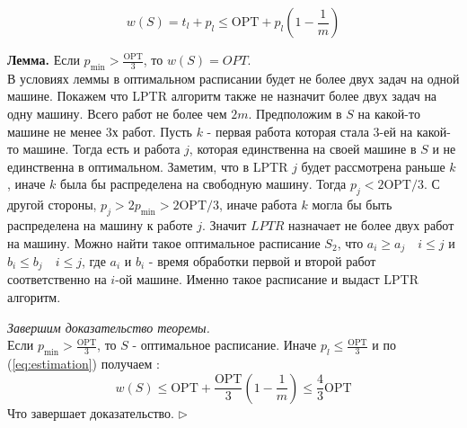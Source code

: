 \documentclass[10pt]{article}
\begin{document}
                \begin{equation} \label{eq:estimation}
                    w(S) = t_l + p_l \leq \text{OPT} + p_l (1 - \frac{1}{m}) 
                \end{equation}

                \textbf{Лемма.} Если $p_{\min} > \frac{\text{OPT}}{3}$, то $w(S) = OPT$. \\
                 В условиях леммы в оптимальном расписании будет не более двух задач на одной машине. Покажем что LPTR алгоритм также не назначит более двух задач на одну машину. Всего работ не более чем $2m$. Предположим в $S$ на какой-то машине не менее 3х работ. Пусть $k$ - первая работа которая стала 3-ей на какой-то машине. Тогда есть и работа $j$, которая единственна на своей машине в $S$  
                и не единственна в оптимальном. Заметим, что в LPTR $j$ будет рассмотрена раньше $k$ , иначе $k$ была бы распределена на свободную машину. Тогда $p_j < 2 \text{OPT} /3 $. С другой стороны, $p_j > 2 p_{\min} > 2 \text{OPT}/3$, иначе работа $k$ могла бы быть распределена на машину к работе $j$. Значит $LPTR$ назначает не более двух работ на машину. Можно найти такое оптимальное расписание $S_2$, что $a_i \geq a_j \quad i \leq j$ и $b_i \leq b_j \quad i \leq j$, где $a_i$ и $b_i$ - время обработки первой и второй работ соответственно на $i$-ой машине. Именно такое расписание и выдаст LPTR алгоритм.

                {\itshape Завершим доказательство теоремы.} \\
                Если $p_{\min} > \frac{\text{OPT}}{3}$, то $S$ - оптимальное расписание. Иначе $p_l \leq \frac{\text{OPT}}{3}$ 
                и по (\ref{eq:estimation}) получаем :
                \begin{equation}
                    w(S) \leq \text{OPT} + \frac{\text{OPT}}{3} (1 - \frac{1}{m}) \leq \frac{4}{3} \text{OPT}
                \end{equation}
                Что завершает доказательство. $\triangleright$
\end{document}
